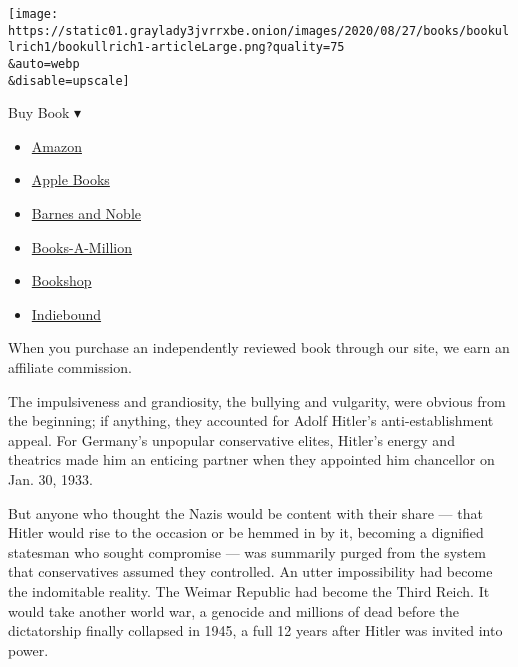 \texttt{[image: https://static01.graylady3jvrrxbe.onion/images/2020/08/27/books/bookullrich1/bookullrich1-articleLarge.png?quality=75\\\&auto=webp\\\&disable=upscale]}

Buy Book ▾

\begin{itemize}
\tightlist
\item
  \href{https://www.amazon.com/gp/search?index=books\&tag=NYTBSREV-20\&field-keywords=Hitler\%3A+Downfall\%2C+1939-1945+Volker+Ullrich}{Amazon}
\item
  \href{https://du-gae-books-dot-nyt-du-prd.appspot.com/buy?title=Hitler\%3A+Downfall\%2C+1939-1945\&author=Volker+Ullrich}{Apple
  Books}
\item
  \href{https://www.anrdoezrs.net/click-7990613-11819508?url=https\%3A\%2F\%2Fwww.barnesandnoble.com\%2Fw\%2F\%3Fean\%3D9781101874004}{Barnes
  and Noble}
\item
  \href{https://www.anrdoezrs.net/click-7990613-35140?url=https\%3A\%2F\%2Fwww.booksamillion.com\%2Fp\%2FHitler\%253A\%2BDownfall\%252C\%2B1939-1945\%2FVolker\%2BUllrich\%2F9781101874004}{Books-A-Million}
\item
  \href{https://bookshop.org/a/3546/9781101874004}{Bookshop}
\item
  \href{https://www.indiebound.org/book/9781101874004?aff=NYT}{Indiebound}
\end{itemize}

When you purchase an independently reviewed book through our site, we
earn an affiliate commission.

The impulsiveness and grandiosity, the bullying and vulgarity, were
obvious from the beginning; if anything, they accounted for Adolf
Hitler's anti-establishment appeal. For Germany's unpopular conservative
elites, Hitler's energy and theatrics made him an enticing partner when
they appointed him chancellor on Jan. 30, 1933.

But anyone who thought the Nazis would be content with their share ---
that Hitler would rise to the occasion or be hemmed in by it, becoming a
dignified statesman who sought compromise --- was summarily purged from
the system that conservatives assumed they controlled. An utter
impossibility had become the indomitable reality. The Weimar Republic
had become the Third Reich. It would take another world war, a genocide
and millions of dead before the dictatorship finally collapsed in 1945,
a full 12 years after Hitler was invited into power.

